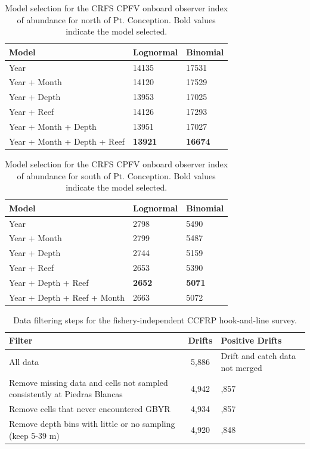 \documentclass[12pt,]{article}
\begin{document}
\begin{table}[ht]
\centering
\caption{Model selection for the CRFS CPFV onboard observer 
                                        index of abundance for north of Pt. Conception. Bold 
                                        values indicate the model selected.} 
\label{tab:Fleet6_AIC}
\begin{tabular}{lll}
  \hline
Model & Lognormal & Binomial \\ 
  \hline
Year & 14135 & 17531 \\ 
  Year + Month & 14120 & 17529 \\ 
  Year + Depth & 13953 & 17025 \\ 
  Year + Reef & 14126 & 17293 \\ 
  Year + Month + Depth & 13951 & 17027 \\ 
  Year + Month + Depth + Reef & \textbf{13921} & \textbf{16674} \\ 
   \hline
\end{tabular}
\end{table}

\vspace{3cm}

\begin{table}[ht]
\centering
\caption{Model selection for the CRFS CPFV onboard observer 
                                        index of abundance for south of Pt. Conception. Bold 
                                        values indicate the model selected.} 
\label{tab:Fleet7_AIC}
\begin{tabular}{lll}
  \hline
Model & Lognormal & Binomial \\ 
  \hline
Year & 2798 & 5490 \\ 
  Year + Month & 2799 & 5487 \\ 
  Year + Depth & 2744 & 5159 \\ 
  Year + Reef & 2653 & 5390 \\ 
  Year + Depth + Reef & \textbf{2652} & \textbf{5071} \\ 
  Year + Depth + Reef + Month & 2663 & 5072 \\ 
   \hline
\end{tabular}
\end{table}

\newpage

\begin{table}[ht]
\centering
\caption{Data filtering steps for the fishery-independent CCFRP hook-and-line survey.} 
\label{tab:Fleet9_Filter}
\begin{tabular}{>{\raggedright}p{3.5in}c>{\centering}p{1.4in}}
  \hline
Filter & Drifts & Positive Drifts \\ 
  \hline
All data & 5,886 & Drift and catch data not merged \\ 
  Remove missing data and cells not sampled consistently at Piedras Blancas & 4,942 & 3,857 \\ 
  Remove cells that never encountered GBYR & 4,934 & 3,857 \\ 
  Remove depth bins with little or no sampling (keep 5-39 m) & 4,920 & 3,848 \\ 
   \hline
\end{tabular}
\end{table}
\end{document}
